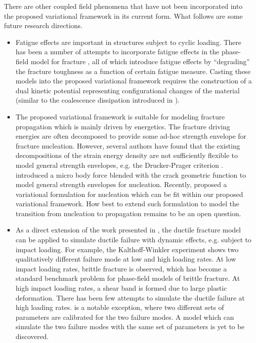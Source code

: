 
There are other coupled field phenomena that have not been incorporated into the proposed variational framework in its current form. What follows are some future research directions.
\begin{itemize}
  \item Fatigue effects are important in structures subject to cyclic loading. There has been a number of attempts to incorporate fatigue effects in the phase-field model for fracture \cite{seiler2020efficient,mesgarnejad2019phase,alessi2018phenomenological,lo2019phase}, all of which introduce fatigue effects by ``degrading'' the fracture toughness as a function of certain fatigue measure. Casting these models into the proposed variational framework requires the construction of a dual kinetic potential representing configurational changes of the material (similar to the coalescence dissipation introduced in ).
  \item The proposed variational framework is suitable for modeling fracture propagation which is mainly driven by energetics. The fracture driving energies are often decomposed to provide some ad-hoc strength envelope for fracture nucleation. However, several authors have found that the existing decompositions of the strain energy density are not sufficiently flexible to model general strength envelopes, e.g. the Drucker-Prager criterion \cite{tanne2018crack,kumar2020revisiting}. \citet{kumar2020revisiting} introduced a micro body force blended with the crack geometric function to model general strength envelopes for nucleation. Recently, \citet{de2021nucleation} proposed a variational formulation for nucleation which can be fit within our proposed variational framework. How best to extend such formulation to model the transition from nucleation to propagation remains to be an open question.
  \item As a direct extension of the work presented in , the ductile fracture model can be applied to simulate ductile failure with dynamic effects, e.g. subject to impact loading. For example, the Kalthoff-Winkler experiment \cite{kalthoff1988failure} shows two qualitatively different failure mode at low and high loading rates. At low impact loading rates, brittle fracture is observed, which has become a standard benchmark problem for phase-field models of brittle fracture. At high impact loading rates, a shear band is formed due to large plastic deformation. There has been few attempts to simulate the ductile failure at high loading rates. \cite{ulmer2013phase} is a notable exception, where two different sets of parameters are calibrated for the two failure modes. A model which can simulate the two failure modes with the same set of parameters is yet to be discovered.

\end{itemize}
